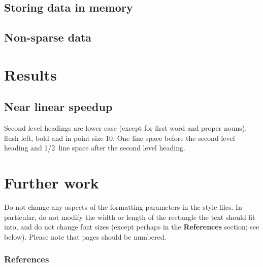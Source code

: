 \documentclass{article} %
\begin{document}
\subsection{Storing data in memory}

\subsection{Non-sparse data}

\section{Results}
\label{headings}

\subsection{Near linear speedup}

Second level headings are lower case (except for first word and proper nouns),
flush left, bold and in point size 10. One line space before the second level
heading and 1/2~line space after the second level heading.

\section{Further work}
Do not change any aspects of the formatting parameters in the style files.
In particular, do not modify the width or length of the rectangle the text
should fit into, and do not change font sizes (except perhaps in the
\textbf{References} section; see below). Please note that pages should be
numbered.


\subsubsection*{References}
\cite{niu2011hogwild}
\cite{bradley2011parallel}
\cite{zhang2012comunication}

\begingroup
\renewcommand{\section}[2]{}%

	
\endgroup
\end{document}
